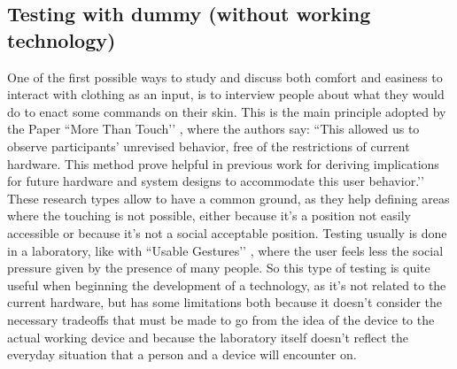 \documentclass{sigchi}
\begin{document}
\subsection{Testing with dummy (without working technology)}
One of the first possible ways to study and discuss both comfort and easiness  to interact with clothing as an input, is to interview people about what they would do to enact some commands on their skin. This is the main principle adopted by the Paper ``More Than Touch’’ \cite[p. 181]{more-touch}, where the authors say: ``This allowed us to observe participants’ unrevised behavior, free of the restrictions of current hardware. This method prove helpful in previous work for deriving implications for future hardware and system designs to accommodate this user behavior.’’
These research types allow to have a common ground, as they help defining areas where the touching is not possible, either because it’s a position not easily accessible or because it’s not a social acceptable position. Testing usually is done in a laboratory, like with ``Usable Gestures’’ \cite{usable-gesture}, where the user feels less the social pressure given by the presence of many people. So this type of testing is quite useful when beginning the development of a technology, as it’s not related to the current hardware, but has some limitations both because it doesn’t consider the necessary tradeoffs that must be made to go from the idea of the device to the actual working device and because the laboratory itself doesn’t reflect the everyday situation that a person and a device will encounter on.
\end{document}
